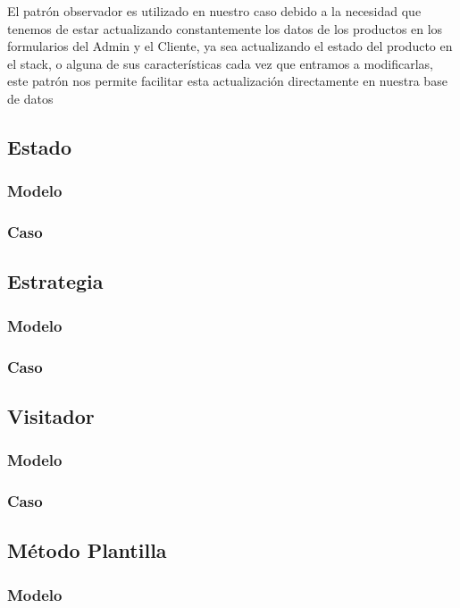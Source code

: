 El patrón observador es utilizado en nuestro caso debido a la necesidad que tenemos de estar actualizando constantemente los datos de los productos en los formularios del Admin y el Cliente, ya sea actualizando el estado del producto en el stack, o alguna de sus características cada vez que entramos a modificarlas, este patrón nos permite facilitar esta actualización directamente en nuestra base de datos
\newpage

\newpage

\subsection{Estado}
\subsubsection{Modelo}
\newpage
\subsubsection{Caso}
\newpage

\subsection{Estrategia}
\subsubsection{Modelo}
\newpage
\subsubsection{Caso}
\newpage

\subsection{Visitador}
\subsubsection{Modelo}
\newpage
\subsubsection{Caso}
\newpage

\subsection{Método Plantilla}
\subsubsection{Modelo}
\newpage
